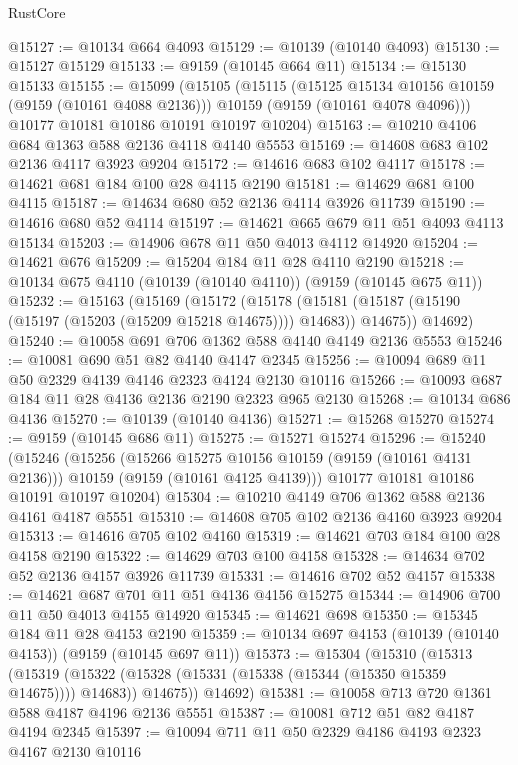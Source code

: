 \begin{lexlean}{RustCore}
\begin{coremodule}
@15127 := @10134 @664 @4093
@15129 := @10139 (@10140 @4093)
@15130 := @15127 @15129
@15133 := @9159 (@10145 @664 @11)
@15134 := @15130 @15133
@15155 := @15099
    (@15105
      (@15115
        (@15125 @15134 @10156 @10159 (@9159 (@10161 @4088 @2136)))
        @10159
        (@9159 (@10161 @4078 @4096)))
      @10177
      @10181
      @10186
      @10191
      @10197
      @10204)
@15163 := @10210 @4106 @684 @1363 @588 @2136 @4118 @4140 @5553
@15169 := @14608 @683 @102 @2136 @4117 @3923 @9204
@15172 := @14616 @683 @102 @4117
@15178 := @14621 @681 @184 @100 @28 @4115 @2190
@15181 := @14629 @681 @100 @4115
@15187 := @14634 @680 @52 @2136 @4114 @3926 @11739
@15190 := @14616 @680 @52 @4114
@15197 := @14621 @665 @679 @11 @51 @4093 @4113 @15134
@15203 := @14906 @678 @11 @50 @4013 @4112 @14920
@15204 := @14621 @676
@15209 := @15204 @184 @11 @28 @4110 @2190
@15218 := @10134 @675 @4110 (@10139 (@10140 @4110)) (@9159 (@10145 @675 @11))
@15232 := @15163
    (@15169
      (@15172
        (@15178 (@15181 (@15187 (@15190 (@15197 (@15203 (@15209 @15218 @14675)))) @14683)) @14675))
      @14692)
@15240 := @10058 @691 @706 @1362 @588 @4140 @4149 @2136 @5553
@15246 := @10081 @690 @51 @82 @4140 @4147 @2345
@15256 := @10094 @689 @11 @50 @2329 @4139 @4146 @2323 @4124 @2130 @10116
@15266 := @10093 @687 @184 @11 @28 @4136 @2136 @2190 @2323 @965 @2130
@15268 := @10134 @686 @4136
@15270 := @10139 (@10140 @4136)
@15271 := @15268 @15270
@15274 := @9159 (@10145 @686 @11)
@15275 := @15271 @15274
@15296 := @15240
    (@15246
      (@15256
        (@15266 @15275 @10156 @10159 (@9159 (@10161 @4131 @2136)))
        @10159
        (@9159 (@10161 @4125 @4139)))
      @10177
      @10181
      @10186
      @10191
      @10197
      @10204)
@15304 := @10210 @4149 @706 @1362 @588 @2136 @4161 @4187 @5551
@15310 := @14608 @705 @102 @2136 @4160 @3923 @9204
@15313 := @14616 @705 @102 @4160
@15319 := @14621 @703 @184 @100 @28 @4158 @2190
@15322 := @14629 @703 @100 @4158
@15328 := @14634 @702 @52 @2136 @4157 @3926 @11739
@15331 := @14616 @702 @52 @4157
@15338 := @14621 @687 @701 @11 @51 @4136 @4156 @15275
@15344 := @14906 @700 @11 @50 @4013 @4155 @14920
@15345 := @14621 @698
@15350 := @15345 @184 @11 @28 @4153 @2190
@15359 := @10134 @697 @4153 (@10139 (@10140 @4153)) (@9159 (@10145 @697 @11))
@15373 := @15304
    (@15310
      (@15313
        (@15319 (@15322 (@15328 (@15331 (@15338 (@15344 (@15350 @15359 @14675)))) @14683)) @14675))
      @14692)
@15381 := @10058 @713 @720 @1361 @588 @4187 @4196 @2136 @5551
@15387 := @10081 @712 @51 @82 @4187 @4194 @2345
@15397 := @10094 @711 @11 @50 @2329 @4186 @4193 @2323 @4167 @2130 @10116

\end{coremodule}
\end{lexlean}
